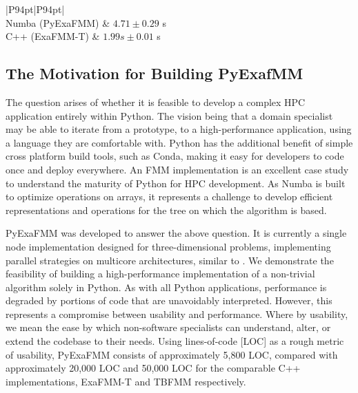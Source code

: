 \documentclass{IEEEcsmag}
\begin{document}
\begin{table}
	\caption{Laplace kernel evaluations over 100,000 randomly distributed particles. Coordinate components, and source charge densities chosen in interval $[0, 1)$. Repeated seven times for statistics.}
	\label{tab:kernel_evals}
	\begin{tabular}{ |P{94pt}|P{94pt}|}
		\hline
		 \\
		\hline
		Numba (PyExaFMM) & $4.71 \pm 0.29$ s \\
		C++ (ExaFMM-T)   & $1.99 s \pm 0.01$ s \\
		\hline
	   \end{tabular}
\end{table}

\subsection{The Motivation for Building PyExafMM}

The question arises of whether it is feasible to develop a complex HPC application entirely within Python. The vision being that a domain specialist may be able to iterate from a prototype, to a high-performance application, using a language they are comfortable with. Python has the additional benefit of simple cross platform build tools, such as Conda, making it easy for developers to code once and deploy everywhere. An FMM implementation is an excellent case study to understand the maturity of Python for HPC development. As Numba is built to optimize operations on arrays, it represents a challenge to develop efficient representations and operations for the tree on which the algorithm is based.

PyExaFMM was developed to answer the above question. It is currently a single node implementation designed for three-dimensional problems, implementing parallel strategies on multicore architectures, similar to \cite{Bramas2020, Wang2021}. We demonstrate the feasibility of building a high-performance implementation of a non-trivial algorithm solely in Python. As with all Python applications, performance is degraded by portions of code that are unavoidably interpreted. However, this represents a compromise between usability and performance. Where by usability, we mean the ease by which non-software specialists can understand, alter, or extend the codebase to their needs. Using lines-of-code [LOC] as a rough metric of usability, PyExaFMM consists of approximately 5,800 LOC, compared with approximately 20,000 LOC and 50,000 LOC for the comparable C++ implementations, ExaFMM-T \cite{Wang2021} and TBFMM \cite{Bramas2020} respectively.
\end{document}
